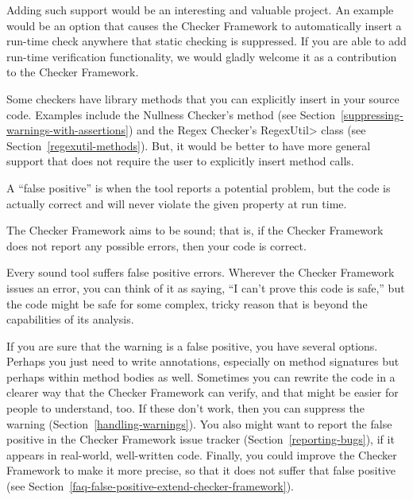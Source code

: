 Adding such support would be an interesting and valuable project.
An example would be an option that causes the Checker Framework to
automatically insert a run-time check anywhere that static checking is
suppressed.
If you
are able to add run-time verification functionality, we would gladly
welcome it as a contribution to the Checker Framework.

Some checkers have library methods that you can explicitly insert in your
source code.
Examples include the Nullness Checker's
 method (see
Section~\ref{suppressing-warnings-with-assertions}) and the Regex Checker's
\<RegexUtil> class (see Section~\ref{regexutil-methods}).
But, it would be better to have more general support that does not require
the user to explicitly insert method calls.





A ``false positive'' is when the tool reports a potential problem, but the
code is actually correct and will never violate the given property at run
time.

The Checker Framework aims to be sound; that is, if the Checker Framework
does not report any possible errors, then your code is correct.

Every sound tool suffers false positive errors.
Wherever the Checker Framework issues an error, you can think of it as
saying, ``I can't prove this code is safe,'' but the code might be safe for
some complex, tricky reason that is beyond the capabilities of its
analysis.

If you are sure that the warning is a false positive, you have several
options.
Perhaps you just need to write annotations, especially on method signatures
but perhaps within method bodies as well.
Sometimes you can rewrite the code in a clearer way that the Checker
Framework can verify, and that might be easier for people to understand, too.
If these don't work, then you can suppress the warning
(Section~\ref{handling-warnings}).
You also might want to report
the false positive in the Checker Framework issue tracker
(Section~\ref{reporting-bugs}), if it appears in real-world, well-written code.
%
Finally, you could improve the Checker Framework to make it more
precise, so that it does not suffer that false positive (see
Section~\ref{faq-false-positive-extend-checker-framework}).


